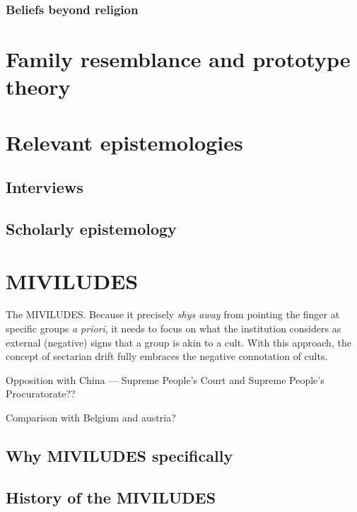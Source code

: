 \subsubsection{Beliefs beyond religion}
\label{subsubsec:beliefs_beyond_religion}

\section{Family resemblance and prototype theory}
\label{sec:prototype_theory}

\section{Relevant epistemologies}
\label{sec:epistemologies}

\subsection{Interviews}
\label{subsec:epistemology_interviews}

\subsection{Scholarly epistemology}
\label{subsec:epistemology_scholarly}

\section{MIVILUDES}
\label{sec:MIVILUDES}

The MIVILUDES. Because it precisely \textit{shys away} from pointing the finger at specific groups \textit{a priori}, it needs to focus on what the institution considers as external (negative) signs that a group is akin to a cult. With this approach, the concept of sectarian drift fully embraces the negative connotation of {cults}.

Opposition with China — Supreme People’s Court and Supreme People’s Procuratorate??

Comparison with Belgium and austria?

\subsection{Why MIVILUDES specifically}
\label{subsec:why_miviludes}

\subsection{History of the MIVILUDES}
\label{subsec:miviludes_history}

